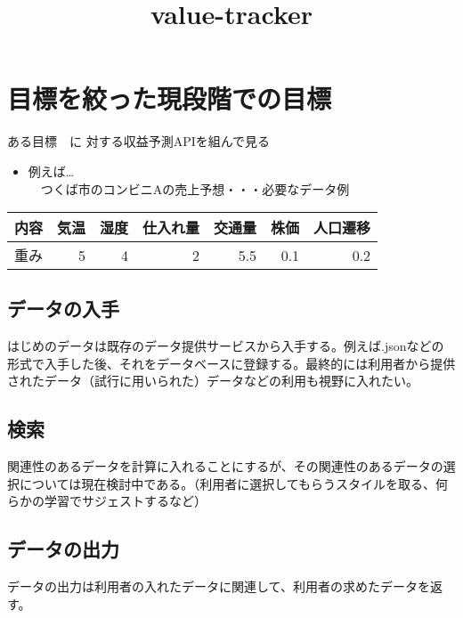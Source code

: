 \documentclass{scrartcl}
\author{}
\date{}
\title{value-tracker}
\begin{document}
\maketitle
\section{目標を絞った現段階での目標}
\label{sec:org9549e18}
ある目標　に 対する収益予測APIを組んで見る\\
\begin{itemize}
\item 例えば\ldots{}\\
　つくば市のコンビニAの売上予想・・・必要なデータ例\\
\end{itemize}
\begin{center}
\begin{tabular}{lrrrrrr}
\hline
内容 & 気温 & 湿度 & 仕入れ量 & 交通量 & 株価 & 人口遷移\\
\hline
重み & 5 & 4 & 2 & 5.5 & 0.1 & 0.2\\
\hline
\end{tabular}
\end{center}
\subsection{データの入手}
\label{sec:orgfb068d6}
はじめのデータは既存のデータ提供サービスから入手する。例えば.jsonなどの形式で入手した後、それをデータベースに登録する。最終的には利用者から提供されたデータ（試行に用いられた）データなどの利用も視野に入れたい。\\
\subsection{検索}
\label{sec:org68b68b6}
関連性のあるデータを計算に入れることにするが、その関連性のあるデータの選択については現在検討中である。（利用者に選択してもらうスタイルを取る、何らかの学習でサジェストするなど）\\
\subsection{データの出力}
\label{sec:org71ae6b2}
データの出力は利用者の入れたデータに関連して、利用者の求めたデータを返す。\\
\end{document}

